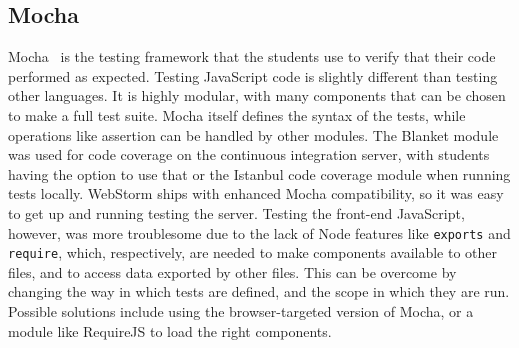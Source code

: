 \documentclass[12pt]{article}
\newcommand{\code}[1]{{\texttt {#1}}}
\begin{document}
\subsection{Mocha}\label{sec:mocha}
Mocha~\cite{Mocha} is the testing framework that the students use to verify that their code performed as expected. 
Testing JavaScript code is slightly different than testing other languages. It is highly modular, with many components that can be chosen to make a full test suite. Mocha itself defines the syntax of the tests, while operations like assertion can be handled by other modules. The Blanket module was used for code coverage on the continuous integration server, with students having the option to use that or the Istanbul code coverage module when running tests locally. WebStorm ships with enhanced Mocha compatibility, so it was easy to get up and running testing the server. Testing the front-end JavaScript, however, was more troublesome due to the lack of Node features like \code{exports} and \code{require}, which, respectively, are needed to make components available to other files, and to access data exported by other files. This can be overcome by changing the way in which tests are defined, and the scope in which they are run. Possible solutions include using the browser-targeted version of Mocha, or a module like RequireJS to load the right components.
\end{document}
